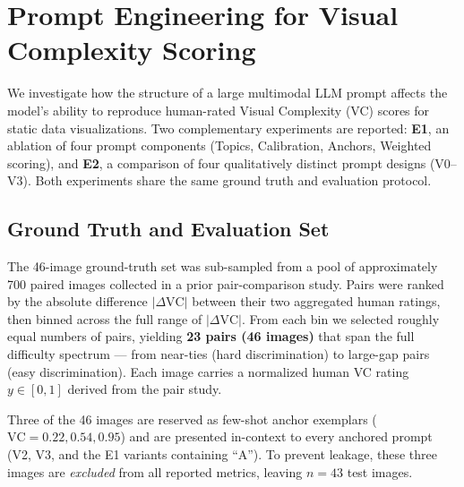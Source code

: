 
\appendix
\section{Prompt Engineering for Visual Complexity Scoring}
\label{app:vc-prompts}

We investigate how the structure of a large multimodal LLM prompt affects the
model's ability to reproduce human-rated Visual Complexity (VC) scores for
static data visualizations. Two complementary experiments are reported:
\textbf{E1}, an ablation of four prompt components (Topics, Calibration,
Anchors, Weighted scoring), and \textbf{E2}, a comparison of four
qualitatively distinct prompt designs (V0--V3). Both experiments share the
same ground truth and evaluation protocol.

\subsection{Ground Truth and Evaluation Set}
\label{app:vc-gt}

The 46-image ground-truth set was sub-sampled from a pool of approximately
700 paired images collected in a prior pair-comparison study. Pairs were
ranked by the absolute difference $|\Delta \mathrm{VC}|$ between their two
aggregated human ratings, then binned across the full range of
$|\Delta \mathrm{VC}|$. From each bin we selected roughly equal numbers of
pairs, yielding \textbf{23 pairs (46 images)} that span the full difficulty
spectrum --- from near-ties (hard discrimination) to large-gap pairs (easy
discrimination). Each image carries a normalized human VC rating
$y \in [0,1]$ derived from the pair study.

Three of the 46 images are reserved as few-shot anchor exemplars
($\mathrm{VC} = 0.22, 0.54, 0.95$) and are presented in-context to every
anchored prompt (V2, V3, and the E1 variants containing ``A''). To prevent
leakage, these three images are \emph{excluded} from all reported metrics,
leaving $n = 43$ test images.

